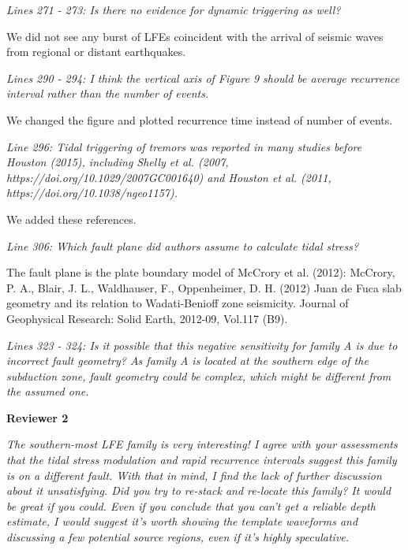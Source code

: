 \documentclass[letterpaper, 12pt]{article}
\begin{document}
\bigskip

\textit{Lines 271 - 273: Is there no evidence for dynamic triggering as well?}

\bigskip

We did not see any burst of LFEs coincident with the arrival of seismic waves from regional or distant earthquakes.

\bigskip

\textit{Lines 290 - 294: I think the vertical axis of Figure 9 should be average recurrence interval rather than the number of events.}

\bigskip

We changed the figure and plotted recurrence time instead of number of events.

\bigskip

\textit{Line 296: Tidal triggering of tremors was reported in many studies before Houston (2015), including Shelly et al. (2007, https://doi.org/10.1029/2007GC001640) and Houston et al. (2011, https://doi.org/10.1038/ngeo1157).}

\bigskip

We added these references.

\bigskip

\textit{Line 306: Which fault plane did authors assume to calculate tidal stress?}

\bigskip

The fault plane is the plate boundary model of McCrory et al. (2012): McCrory, P. A., Blair, J. L., Waldhauser, F., Oppenheimer, D. H. (2012) Juan de Fuca slab geometry and its relation to Wadati-Benioff zone seismicity. 
Journal of Geophysical Research: Solid Earth, 2012-09, Vol.117 (B9).

\bigskip

\textit{Lines 323 - 324: Is it possible that this negative sensitivity for family A is due to incorrect fault geometry? As family A is located at the southern edge of the subduction zone, fault geometry could be complex, which might be different from the assumed one.}

\bigskip

\textbf{Reviewer 2}

\bigskip

\textit{The southern-most LFE family is very interesting! I agree with your assessments that the tidal stress modulation and rapid recurrence intervals suggest this family is on a different fault. With that in mind, I find the lack of further discussion about it unsatisfying. Did you try to re-stack and re-locate this family? It would be great if you could. Even if you conclude that you can't get a reliable depth estimate, I would suggest it's worth showing the template waveforms and discussing a few potential source regions, even if it's highly speculative.}
\end{document}

